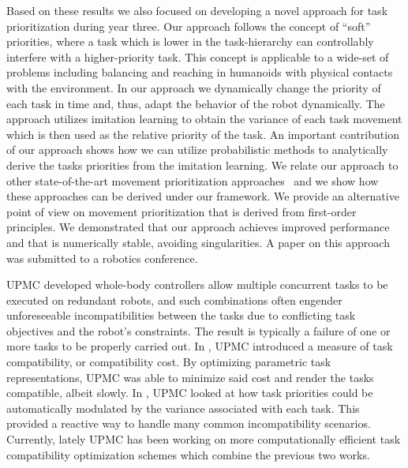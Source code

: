 Based on these results we also focused on developing a novel approach for task 
prioritization during year three. Our approach follows the concept of ``soft'' 
priorities, where a task which is lower in the task-hierarchy can controllably 
interfere with a higher-priority task. This concept is applicable to a wide-set 
of problems including balancing and reaching in humanoids with physical contacts 
with the environment. In our approach we dynamically change the priority of each 
task in time and, thus, adapt the behavior of the robot dynamically.  The 
approach utilizes imitation learning to obtain the variance of each task 
movement which is then used as the relative priority of the task. An important 
contribution of our approach shows how we can utilize probabilistic methods to 
analytically derive the tasks priorities from the imitation learning. We relate 
our approach to other state-of-the-art movement prioritization 
approaches~\cite{Peters_AR_2008, lober2015variance} and we show how these 
approaches can be derived under our framework. We provide an alternative point 
of view on movement prioritization that is derived from first-order principles. 
We demonstrated that our approach achieves improved performance and that is 
numerically stable, avoiding singularities. A paper on this approach was 
submitted to a robotics conference.

UPMC developed whole-body controllers allow multiple concurrent tasks to be 
executed on redundant robots, and such combinations often engender unforeseeable 
incompatibilities between the tasks due to conflicting task objectives and the 
robot's constraints. The result is typically a failure of one or more tasks to 
be properly carried out. In \cite{lober-HUMANOIDS2014}, UPMC introduced a measure of task 
compatibility, or compatibility cost. By optimizing parametric task 
representations, UPMC was able to minimize said cost and render the tasks 
compatible, albeit slowly. In \cite{lober2015variance}, UPMC looked at how task 
priorities could be automatically modulated by the variance associated with each 
task. This provided a reactive way to handle many common incompatibility 
scenarios. Currently, lately UPMC has been working on more computationally 
efficient task compatibility optimization schemes which combine the previous two 
works.   

